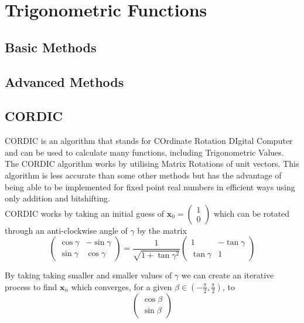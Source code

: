 \section{Trigonometric Functions}
\subsection{Basic Methods}
\subsection{Advanced Methods}
\subsection{CORDIC}
CORDIC is an algorithm that stands for COrdinate Rotation DIgital Computer and can be used to calculate many functions, including Trigonometric Values. The CORDIC algorithm works by utilising Matrix Rotations of unit vectors. This algorithm is less accurate than some other methods but has the advantage of being able to be implemented for fixed point real numbers in efficient ways using only addition and bitshifting.\\

CORDIC works by taking an initial guess of
\begin{math}
	\mathbf{x}_0 = \left( 
		\begin{array}{c}
			1 \\
			0
		\end{array} \right)
\end{math}
which can be rotated through an anti-clockwise angle of $\gamma$ by the matrix
\begin{displaymath}
	\left( \begin{array}{cc}
		\cos{\gamma} & -\sin{\gamma} \\
		\sin{\gamma} &  \cos{\gamma}
	\end{array} \right)
	= \frac{1}{\sqrt{1 + \tan{\gamma}^2}} \left( \begin{array}{cc}
		1 & -\tan{\gamma} \\
		\tan{\gamma} & 1
	\end{array} \right)
\end{displaymath}

By taking taking smaller and smaller values of $\gamma$ we can create an iterative process to find $\mathbf{x}_n$ which converges, for a given $\beta \in (-\frac{\pi}{2}, \frac{\pi}{2})$, to
\begin{displaymath}
	\left( \begin{array}{c}
		\cos{\beta}\\
		\sin{\beta}
	\end{array} \right)
\end{displaymath}

